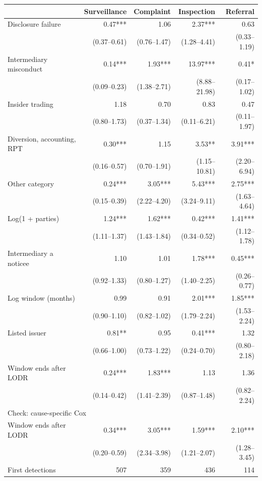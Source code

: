 \begin{tabular*}{\textwidth}[]{l@{\extracolsep\fill}rrrr}
\toprule
 & Surveillance & Complaint & Inspection & Referral\\
\midrule
Disclosure failure & 0.47*** & 1.06 & 2.37*** & 0.63\\
 & (0.37--0.61) & (0.76--1.47) & (1.28--4.41) & (0.33--1.19)\\
Intermediary misconduct & 0.14*** & 1.93*** & 13.97*** & 0.41*\\
 & (0.09--0.23) & (1.38--2.71) & (8.88--21.98) & (0.17--1.02)\\
Insider trading & 1.18 & 0.70 & 0.83 & 0.47\\
 & (0.80--1.73) & (0.37--1.34) & (0.11--6.21) & (0.11--1.97)\\
Diversion, accounting, RPT & 0.30*** & 1.15 & 3.53** & 3.91***\\
 & (0.16--0.57) & (0.70--1.91) & (1.15--10.81) & (2.20--6.94)\\
Other category & 0.24*** & 3.05*** & 5.43*** & 2.75***\\
 & (0.15--0.39) & (2.22--4.20) & (3.24--9.11) & (1.63--4.64)\\
Log(1 + parties) & 1.24*** & 1.62*** & 0.42*** & 1.41***\\
 & (1.11--1.37) & (1.43--1.84) & (0.34--0.52) & (1.12--1.78)\\
Intermediary a noticee & 1.10 & 1.01 & 1.78*** & 0.45***\\
 & (0.92--1.33) & (0.80--1.27) & (1.40--2.25) & (0.26--0.77)\\
Log window (months) & 0.99 & 0.91 & 2.01*** & 1.85***\\
 & (0.90--1.10) & (0.82--1.02) & (1.79--2.24) & (1.53--2.24)\\
Listed issuer & 0.81** & 0.95 & 0.41*** & 1.32\\
 & (0.66--1.00) & (0.73--1.22) & (0.24--0.70) & (0.80--2.18)\\
Window ends after LODR & 0.24*** & 1.83*** & 1.13 & 1.36\\
 & (0.14--0.42) & (1.41--2.39) & (0.87--1.48) & (0.82--2.24)\\
\midrule
\multicolumn{5}{l}{Check: cause-specific Cox}\\
Window ends after LODR & 0.34*** & 3.05*** & 1.59*** & 2.10***\\
 & (0.20--0.59) & (2.34--3.98) & (1.21--2.07) & (1.28--3.45)\\
First detections & 507 & 359 & 436 & 114\\
\bottomrule
\end{tabular*}
